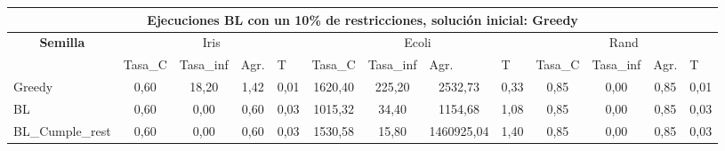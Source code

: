 \documentclass[12pt, spanish]{article}
\begin{document}
\begin{table}[H]
\small
\begin{adjustwidth}{-2cm}{-2cm}%


\begin{tabular}{|l|c|c|c|c|c|c|c|c|c|c|c|c|}
\hline
\multicolumn{13}{|c|}{\textbf{Ejecuciones BL con un 10\% de restricciones, solución inicial: Greedy}}                                                                                                                                                                                                                                                                                                                  \\ \hline
\multicolumn{1}{|c|}{\multirow{2}{*}{\textbf{Semilla}}} & \multicolumn{4}{c|}{Iris}                                                                                          & \multicolumn{4}{c|}{Ecoli}                                                                                         & \multicolumn{4}{c|}{Rand}                                                                                          \\ \cline{2-13} 
\multicolumn{1}{|c|}{}                                  & \multicolumn{1}{l|}{Tasa\_C} & \multicolumn{1}{l|}{Tasa\_inf} & \multicolumn{1}{l|}{Agr.} & \multicolumn{1}{l|}{T} & \multicolumn{1}{l|}{Tasa\_C} & \multicolumn{1}{l|}{Tasa\_inf} & \multicolumn{1}{l|}{Agr.} & \multicolumn{1}{l|}{T} & \multicolumn{1}{l|}{Tasa\_C} & \multicolumn{1}{l|}{Tasa\_inf} & \multicolumn{1}{l|}{Agr.} & \multicolumn{1}{l|}{T} \\ \hline
Greedy                                                  & 0,60                         & 18,20                          & 1,42                      & 0,01                   & 1620,40                      & 225,20                         & 2532,73                   & 0,33                   & 0,85                         & 0,00                           & 0,85                      & 0,01                   \\ \hline
BL                                                      & 0,60                         & 0,00                           & 0,60                      & 0,03                   & 1015,32                      & 34,40                          & 1154,68                   & 1,08                   & 0,85                         & 0,00                           & 0,85                      & 0,03                   \\ \hline
BL\_Cumple\_rest                                        & 0,60                         & 0,00                           & 0,60                      & 0,03                   & 1530,58                      & 15,80                          & 1460925,04                & 1,40                   & 0,85                         & 0,00                           & 0,85                      & 0,03                   \\ \hline

\end{tabular}
\end{adjustwidth}
\end{table}
\end{document}
